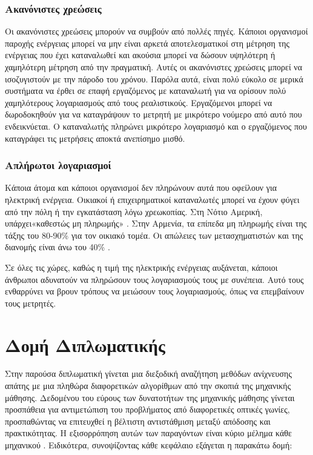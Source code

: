 \subsubsection{Ακανόνιστες χρεώσεις}
Οι ακανόνιστες χρεώσεις μπορούν να συμβούν από πολλές πηγές. Κάποιοι οργανισμοί παροχής ενέργειας μπορεί να μην είναι αρκετά αποτελεσματικοί στη μέτρηση της ενέργειας που έχει καταναλωθεί και ακούσια μπορεί να δώσουν υψηλότερη ή χαμηλότερη μέτρηση από την πραγματική. Αυτές οι ακανόνιστες χρεώσεις μπορεί να ισοζυγιστούν με την πάροδο του χρόνου. Παρόλα αυτά, είναι πολύ εύκολο σε μερικά συστήματα να έρθει σε επαφή εργαζόμενος με καταναλωτή για να ορίσουν  πολύ χαμηλότερους λογαριασμούς από τους ρεαλιστικούς. Εργαζόμενοι μπορεί να δωροδοκηθούν για να καταγράψουν το μετρητή με μικρότερο νούμερο από αυτό που ενδεικνύεται. Ο καταναλωτής πληρώνει μικρότερο λογαριασμό και ο εργαζόμενος που καταγράφει τις μετρήσεις αποκτά ανεπίσημο μισθό.
\subsubsection{Απλήρωτοι λογαριασμοί}
Κάποια άτομα και κάποιοι οργανισμοί δεν πληρώνουν αυτά που οφείλουν για ηλεκτρική ενέργεια. Οικιακοί ή επιχειρηματικοί καταναλωτές  μπορεί να έχουν φύγει από την πόλη ή την εγκατάσταση λόγω χρεωκοπίας. Στη Νότιο Αμερική, υπάρχει«καθεστώς μη πληρωμής» \cite{mkhwanazi}. Στην Αρμενία, τα επίπεδα μη πληρωμής είναι της τάξης του 80-90\% για τον οικιακό τομέα. Οι απώλειες των μετασχηματιστών και της διανομής είναι άνω του 40\% \cite{tacis}.\par
Σε όλες τις χώρες, καθώς η τιμή της ηλεκτρικής ενέργειας αυξάνεται, κάποιοι άνθρωποι αδυνατούν να πληρώσουν τους λογαριασμούς τους με συνέπεια. Αυτό τους ενθαρρύνει να βρουν τρόπους να μειώσουν τους λογαριασμούς, όπως να επεμβαίνουν τους μετρητές.
\section{Δομή Διπλωματικής}
Στην παρούσα διπλωματική γίνεται μια διεξοδική αναζήτηση μεθόδων ανίχνευσης απάτης με μια πληθώρα διαφορετικών αλγορίθμων από την σκοπιά της μηχανικής μάθησης. Δεδομένου του εύρους των δυνατοτήτων της μηχανικής μάθησης γίνεται προσπάθεια για αντιμετώπιση του προβλήματος από διαφορετικές οπτικές γωνίες, προσπαθώντας να επιτευχθεί η βέλτιστη αντιστάθμιση μεταξύ απόδοσης και πρακτικότητας. Η εξισορρόπηση αυτών των παραγόντων είναι κύριο μέλημα κάθε μηχανικού \cite{artoftradeoff}. Ειδικότερα, συνοψίζοντας κάθε κεφάλαιο εξάγεται η παρακάτω δομή:
